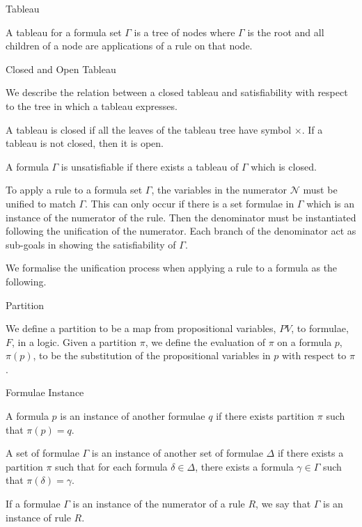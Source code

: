 \documentclass{llncs}
\begin{document}
\begin{definition}{Tableau}

A tableau for a formula set $\Gamma$ is a tree of nodes where $\Gamma$ is the
root and all children of a node are applications of a rule on that node.
\end{definition}

\begin{definition}{Closed and Open Tableau}

We describe the relation between a closed tableau and satisfiability with
respect to the tree in which a tableau expresses.

A tableau is closed if all the leaves of the tableau tree have symbol $\times$.
If a tableau is not closed, then it is open.
\end{definition}

\begin{definition}

A formula $\Gamma$ is unsatisfiable if there exists a tableau of $\Gamma$ which
is closed.
\end{definition}

To apply a rule to a formula set $\Gamma$, the variables in the numerator
$\mathcal{N}$ must be unified to match $\Gamma$. This can only occur if there
is a set formulae in $\Gamma$ which is an instance of the numerator of the
rule. Then the denominator must be instantiated following the unification of
the numerator. Each branch of the denominator act as sub-goals in showing the
satisfiability of $\Gamma$.

We formalise the unification process when applying a rule to a formula as the
following.

\begin{definition}{Partition}\label{Partition}

We define a partition to be a map from propositional variables, $PV$, to
formulae, $F$, in a logic. Given a partition $\pi$, we define the evaluation of
$\pi$ on a formula $p$, $\pi(p)$, to be the substitution of the propositional
variables in $p$ with respect to $\pi$.
\end{definition}

\begin{definition}{Formulae Instance}\label{Formulae Instance}

A formula $p$ is an instance of another formulae $q$ if there exists partition
$\pi$ such that $\pi(p) = q$.

A set of formulae $\Gamma$ is an instance of another set of formulae
$\Delta$ if there exists a partition $\pi$ such that for each formula $\delta
\in \Delta$, there exists a formula $\gamma \in \Gamma$ such that $\pi(\delta)
= \gamma$.

If a formulae $\Gamma$ is an instance of the numerator of a rule $R$, we say
that $\Gamma$ is an instance of rule $R$.
\end{definition}
\end{document}
